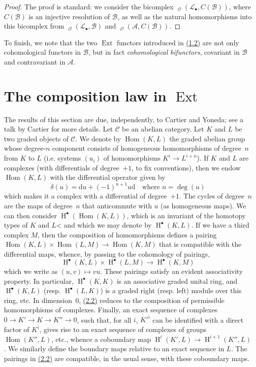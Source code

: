 \documentclass{article}
\newcommand{\scr}[1]{{\mathscr{#1}}}
\renewcommand{\cal}[1]{{\mathcal{#1}}}
\DeclareMathOperator{\Ext}{Ext}
\DeclareMathOperator{\Hom}{Hom}
\DeclareMathOperator{\shHom}{\underline{Hom}}
\DeclareMathOperator{\HH}{H}
\newcommand{\oldpage}[1]{\marginpar{\footnotesize$\Big\vert$ \textit{p.~#1}}}
\begin{document}
\begin{proof}
  The proof is standard: we consider the bicomplex $\shHom_\scr{O}(\scr{L}_\bullet,C(\scr{B}))$, where $C(\scr{B})$ is an injective resolution of $\scr{B}$, as well as the natural homomorphisms into this bicomplex from $\shHom_\scr{O}(\scr{L}_\bullet,\scr{B})$ and $\shHom_\scr{O}(\scr{A},C(\scr{B}))$.
\end{proof}

To finish, we note that the two $\Ext$ functors introduced in \hyperref[1.2]{(1.2)} are not only cohomological functors in $\scr{B}$, but in fact \emph{cohomological bifunctors}, covariant in $\scr{B}$ and contravariant in $\scr{A}$.


\section{The composition law in \texorpdfstring{$\Ext$}{Ext}}
\label{section2}

The results of this section are due, independently, to Cartier and Yoneda;
see a talk by Cartier \cite{1} for more details.
Let $\cal{C}$ be an abelian category.
Let $K$ and $L$ be two graded objects of $\cal{C}$.
We denote by $\Hom(K,L)$ the graded abelian group whose degree-$n$ component consists of homogeneous homomorphisms of degree~$n$ from $K$ to $L$ (i.e. systems $(u_i)$ of homomorphisms $K^i\to L^{i+n}$).
If $K$ and $L$ are complexes (with differentials of degree~$+1$, to fix conventions), then we endow $\Hom(K,L)$ with the differential operator given by
\[
\label{2.1}
  \delta(u) = \mathrm{d}u + (-1)^{n+1}u\mathrm{d}
  \quad\text{where }n=\deg(u)
\tag{2.1}
\]
which makes it a complex with a differential of degree~$+1$.
The cycles of degree~$n$ are the maps of degree~$n$ that anticommute with $u$ (as homogeneous maps).
We can then consider $\HH^\bullet(\Hom(K,L))$, which is an invariant of the homotopy types of $K$ and $L$< and which we may denote by $\HH^\bullet(K,L)$.
If we have a third complex $M$, then the composition of homomorphisms defines a pairing $\Hom(K,L)\times\Hom(L,M)\to\Hom(K,M)$ that is compatible with the differential maps, whence, by passing to the cohomology of pairings,
\[
\label{2.2}
  \HH^\bullet(K,L)\times\HH^\bullet(L,M) \to \HH^\bullet(K,M)
\tag{2.2}
\]
which we write as $(u,v)\mapsto vu$.
These pairings satisfy an evident associativity property.
In particular, $\HH^\bullet(K,K)$ is an associative graded unital ring, and $\HH^\bullet(K,L)$ (resp. $\HH^\bullet(L,K)$) is a graded right (resp. left) module over this ring, etc.
In dimension~$0$, \hyperref[2.2]{(2.2)} reduces to the composition of permissible homomorphisms of complexes.
Finally, an exact sequence of complexes
\oldpage{149-04}
$0\to K'\to K\to K''\to0$, such that, for all $i$, $K'^i$ can be identified with a direct factor of $K^i$, gives rise to an exact sequence of complexes of groups $\Hom(K'',L)$, etc., whence a coboundary map $\HH^i(K',L)\to\HH^{i+1}(K'',L)$.
We similarly define the boundary maps relative to an exact sequence in $L$.
The pairings in \hyperref[2.2]{(2.2)} are compatible, in the usual sense, with these coboundary maps.
\end{document}

